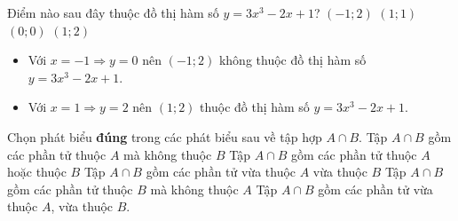 \begin{ex}%
Điểm nào sau đây thuộc đồ thị hàm số  $y=3x^3-2x+1$?
\choice
{$\left( -1;2 \right)$}
{$\left( 1;1 \right)$}
{$\left( 0;0 \right)$}
{\True  $\left( 1;2 \right)$}
	\loigiai
	{\begin{itemize}
			\item Với $ x = -1 \Rightarrow y = 0 $ nên $ (-1;2) $ không thuộc đồ thị hàm số $y=3x^3-2x+1$.
			\item Với $ x = 1 \Rightarrow y = 2 $ nên $ (1;2) $ thuộc đồ thị hàm số $y=3x^3-2x+1$.
		\end{itemize}
	}
\end{ex}
\begin{ex}%
Chọn phát biểu \textbf{đúng} trong các phát biểu sau về tập hợp $A\cap B$.
\choice
{Tập $A\cap B$ gồm các phần tử thuộc $A$ mà không thuộc $B$}
{Tập $A\cap B$ gồm các phần tử thuộc $A$ hoặc thuộc $B$}
{\True Tập $A\cap B$  gồm các phần tử vừa thuộc  $A$ vừa thuộc $B$}
{Tập $A\cap B$  gồm các phần tử thuộc $B$  mà không thuộc $A$} 
	\loigiai
	{Tập $A\cap B$  gồm các phần tử vừa thuộc  $A$, vừa thuộc $B$.
	}
\end{ex}


